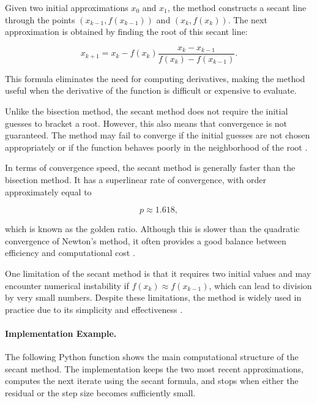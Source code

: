 Given two initial approximations \( x_0 \) and \( x_1 \), the method constructs a secant line through the points \( (x_{k-1}, f(x_{k-1})) \) and \( (x_k, f(x_k)) \). The next approximation is obtained by finding the root of this secant line:

\begin{equation}
x_{k+1} = x_k - f(x_k)\frac{x_k - x_{k-1}}{f(x_k) - f(x_{k-1})}.
\end{equation}

This formula eliminates the need for computing derivatives, making the method useful when the derivative of the function is difficult or expensive to evaluate.

Unlike the bisection method, the secant method does not require the initial guesses to bracket a root. However, this also means that convergence is not guaranteed. The method may fail to converge if the initial guesses are not chosen appropriately or if the function behaves poorly in the neighborhood of the root \cite{kelley}.

In terms of convergence speed, the secant method is generally faster than the bisection method. It has a superlinear rate of convergence, with order approximately equal to

\begin{equation}
p \approx 1.618,
\end{equation}

which is known as the golden ratio. Although this is slower than the quadratic convergence of Newton's method, it often provides a good balance between efficiency and computational cost \cite{burden}.

One limitation of the secant method is that it requires two initial values and may encounter numerical instability if \( f(x_k) \approx f(x_{k-1}) \), which can lead to division by very small numbers. Despite these limitations, the method is widely used in practice due to its simplicity and effectiveness \cite{cs357}.

\paragraph{Implementation Example.}

The following Python function shows the main computational structure of the secant method. The implementation keeps the two most recent approximations, computes the next iterate using the secant formula, and stops when either the residual or the step size becomes sufficiently small.

